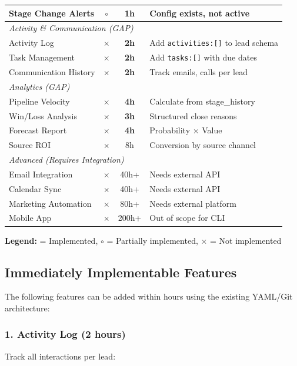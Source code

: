 \begin{table}[htbp]
\begin{tabular}{@{}p{4cm}ccp{5cm}@{}}
Stage Change Alerts & $\circ$ & 1h & Config exists, not active \\
\midrule
\multicolumn{4}{l}{\textit{Activity \& Communication (GAP)}} \\
\midrule
Activity Log & $\times$ & \textbf{2h} & Add \texttt{activities:[]} to lead schema \\
Task Management & $\times$ & \textbf{2h} & Add \texttt{tasks:[]} with due dates \\
Communication History & $\times$ & \textbf{2h} & Track emails, calls per lead \\
\midrule
\multicolumn{4}{l}{\textit{Analytics (GAP)}} \\
\midrule
Pipeline Velocity & $\times$ & \textbf{4h} & Calculate from stage\_history \\
Win/Loss Analysis & $\times$ & \textbf{3h} & Structured close reasons \\
Forecast Report & $\times$ & \textbf{4h} & Probability $\times$ Value \\
Source ROI & $\times$ & 8h & Conversion by source channel \\
\midrule
\multicolumn{4}{l}{\textit{Advanced (Requires Integration)}} \\
\midrule
Email Integration & $\times$ & 40h+ & Needs external API \\
Calendar Sync & $\times$ & 40h+ & Needs external API \\
Marketing Automation & $\times$ & 80h+ & Needs external platform \\
Mobile App & $\times$ & 200h+ & Out of scope for CLI \\
\bottomrule
\end{tabular}
\end{table}

\textbf{Legend:} \checkmark = Implemented, $\circ$ = Partially implemented, $\times$ = Not implemented

\subsection{Immediately Implementable Features}

The following features can be added within hours using the existing YAML/Git architecture:

\subsubsection{1. Activity Log (2 hours)}

Track all interactions per lead:

